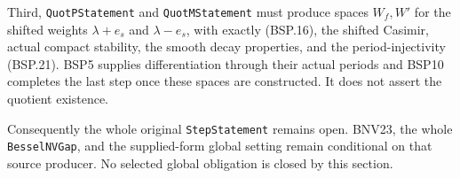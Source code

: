 Third, \texttt{QuotPStatement} and \texttt{QuotMStatement} must produce
spaces $W_f,W'$ for the shifted weights $\lambda+e_s$ and $\lambda-e_s$,
with exactly (BSP.16), the shifted Casimir, actual compact stability,
the smooth decay properties, and the period-injectivity (BSP.21).
BSP5 supplies differentiation through their actual periods and BSP10
completes the last step once these spaces are constructed.  It does
not assert the quotient existence.

Consequently the whole original \texttt{StepStatement} remains open.
BNV23, the whole \texttt{BesselNVGap}, and the supplied-form global setting
remain conditional on that source producer.  No selected global
obligation is closed by this section.
